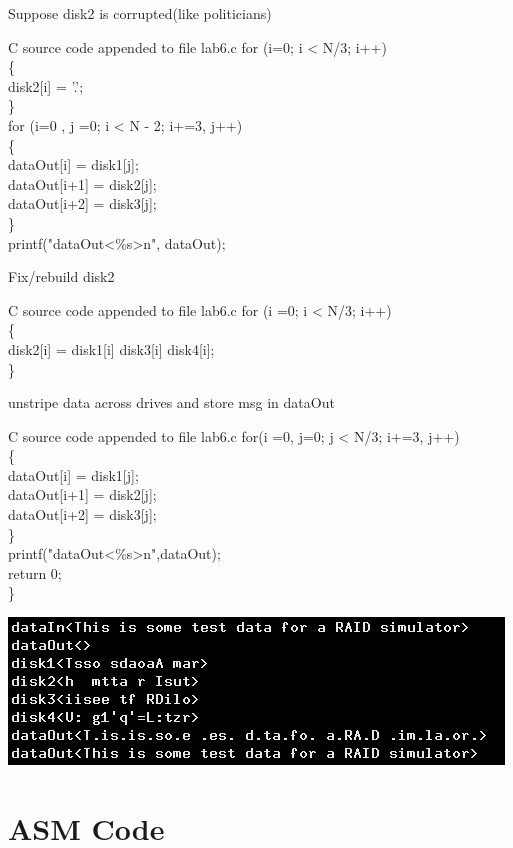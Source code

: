 \documentclass{article}
\begin{document}
\clearpage
Suppose disk2 is corrupted(like politicians)
\begin{multicols}{2}
\begin{GFT}{C source code appended to file lab6.c}
\+for (i=0; i < N/3; i++)\\
\+\{\\
\+  disk2[i] = '.';\\
\+\}\\
\+for (i=0 , j =0; i < N - 2; i+=3, j++)\\
\+\{\\
\+  dataOut[i] = disk1[j];\\
\+  dataOut[i+1] = disk2[j];\\
\+  dataOut[i+2] = disk3[j];\\
\+\}\\
\+printf("dataOut<\%s>\Backslash{}n", dataOut);\\
\end{GFT}
Fix/rebuild disk2
\begin{GFT}{C source code appended to file lab6.c}
\+for (i =0; i < N/3; i++)\\
\+\{\\
\+  disk2[i] = disk1[i] \Circumflex{} disk3[i] \Circumflex{} disk4[i];\\
\+\}\\
\end{GFT}
\columnbreak
unstripe data across drives and store msg in dataOut
\begin{GFT}{C source code appended to file lab6.c}
\+for(i =0, j=0; j < N/3; i+=3, j++)\\
\+\{\\
\+  dataOut[i] = disk1[j];\\
\+  dataOut[i+1] = disk2[j];\\
\+  dataOut[i+2] = disk3[j];\\
\+\}\\
\+printf("dataOut<\%s>\Backslash{}n",dataOut);\\
\+  return 0;\\
\+\}\\
\end{GFT}
\includegraphics[scale=.5]{lab6c.png}
\end{multicols}
\clearpage\section{ASM Code}
\end{document}
